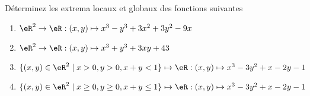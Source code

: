 
\begin{exercice}\label{exoOptimSS0003}

Déterminez les extrema locaux et globaux des fonctions suivantes
\begin{enumerate}
\item $ \eR^2 \rightarrow \eR : (x,y) \mapsto x^3 -y^3 + 3x^2 +3y^2 -9x $
\item $ \eR^2 \rightarrow \eR : (x,y) \mapsto x^3 + y^3 + 3xy + 43 $
\item $ \{ (x,y) \in \eR^2 \mid x > 0, y > 0, x+y < 1 \} \mapsto  \eR: (x,y) \mapsto x^3 -3y^2 +x -2y -1$
\item $ \{ (x,y) \in \eR^2 \mid x \geq 0, y \geq 0, x+y \leq 1 \} \mapsto  \eR: (x,y) \mapsto x^3 -3y^2 +x -2y -1$
\end{enumerate}

\end{exercice}
